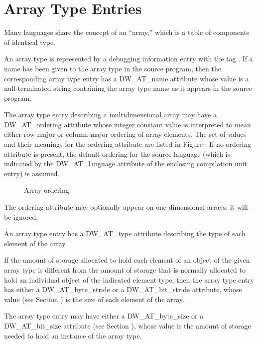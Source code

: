 \section{Array Type Entries}
\label{chap:arraytypeentries}

Many languages share the concept of an ``array,'' which is
a table of components of identical type.

An array type is represented by a debugging information entry
with the tag . 
If a name has been given to
the array type in the source program, then the corresponding
array type entry has a DW\_AT\_name attribute whose value is a
null-terminated string containing the array type name as it
appears in the source program.

The array type entry describing a multidimensional array may
have a DW\_AT\_ordering attribute whose integer constant value is
interpreted to mean either row-major or column-major ordering
of array elements. The set of values and their meanings
for the ordering attribute are listed in 
Figure . 
If no
ordering attribute is present, the default ordering for the
source language (which is indicated by the DW\_AT\_language
attribute of the enclosing compilation unit entry) is assumed.

\begin{figure}[here]
\caption{Array ordering}\label{fig:arrayordering}
\end{figure}

The ordering attribute may optionally appear on one-dimensional
arrays; it will be ignored.

An array type entry has a DW\_AT\_type attribute describing
the type of each element of the array.

If the amount of storage allocated to hold each element of an
object of the given array type is different from the amount
of storage that is normally allocated to hold an individual
object of the indicated element type, then the array type
entry has either a DW\_AT\_byte\_stride or a DW\_AT\_bit\_stride
attribute, whose value 
(see Section ) 
is the size of each
element of the array.

The array type entry may have either a DW\_AT\_byte\_size or a
DW\_AT\_bit\_size attribute 
(see Section ), 
whose value is the
amount of storage needed to hold an instance of the array type.


